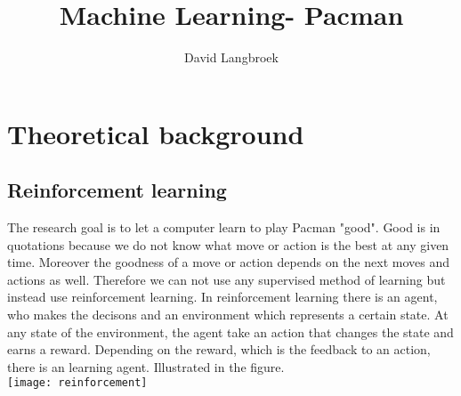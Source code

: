 \documentclass[a4paper]{article}
\title{Machine Learning- Pacman}
\author{David Langbroek}
\begin{document}
\maketitle

\section{Theoretical background}
\subsection{Reinforcement learning}
The research goal is to let a computer learn to play Pacman "good". Good is in quotations because we do not know what move or action is the best at any given time. Moreover the goodness of a move or action depends on the next moves and actions as well. Therefore we can not use any supervised method of learning but instead use reinforcement learning. In reinforcement learning there is an agent, who makes the decisons and an environment which represents a certain state. At any state of the environment, the agent take an action that changes the state and earns a reward. Depending on the reward, which is the feedback to an action, there is an learning agent. Illustrated in the figure. \\
\texttt{[image: reinforcement]}
\end{document}
